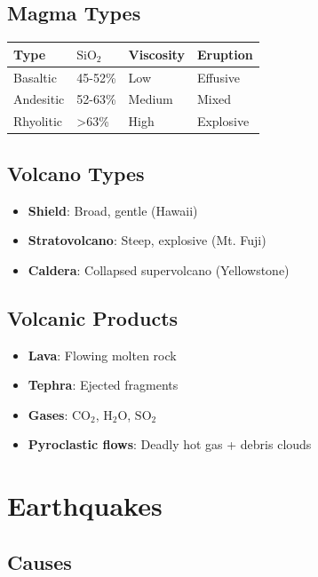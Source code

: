 \documentclass[
  11pt,
  letterpaper,
  twoside,
  openright]{book}
\providecommand{\tightlist}{%
  \setlength{\itemsep}{0pt}\setlength{\parskip}{0pt}}
\begin{document}
\subsection{Magma Types}\label{magma-types}

\begin{longtable}[]{@{}llll@{}}
\toprule\noalign{}
Type & \(\text{SiO}_2\) & Viscosity & Eruption \\
\midrule\noalign{}
\endhead
\bottomrule\noalign{}
\endlastfoot
Basaltic & 45-52\% & Low & Effusive \\
Andesitic & 52-63\% & Medium & Mixed \\
Rhyolitic & \textgreater63\% & High & Explosive \\
\end{longtable}

\subsection{Volcano Types}\label{volcano-types}

\begin{itemize}
\tightlist
\item
  \textbf{Shield}: Broad, gentle (Hawaii)
\item
  \textbf{Stratovolcano}: Steep, explosive (Mt. Fuji)
\item
  \textbf{Caldera}: Collapsed supervolcano (Yellowstone)
\end{itemize}

\subsection{Volcanic Products}\label{volcanic-products}

\begin{itemize}
\tightlist
\item
  \textbf{Lava}: Flowing molten rock
\item
  \textbf{Tephra}: Ejected fragments
\item
  \textbf{Gases}: \(\text{CO}_2\), \(\text{H}_2\text{O}\),
  \(\text{SO}_2\)
\item
  \textbf{Pyroclastic flows}: Deadly hot gas + debris clouds
\end{itemize}

\section{Earthquakes}\label{earthquakes}

\subsection{Causes}\label{causes}
\end{document}
